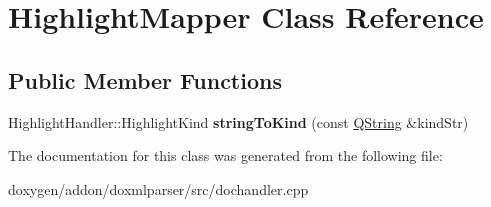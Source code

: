\hypertarget{class_highlight_mapper}{}\section{Highlight\+Mapper Class Reference}
\label{class_highlight_mapper}
\subsection*{Public Member Functions}
\begin{DoxyCompactItemize}
\item 
\mbox{\label{class_highlight_mapper_abdfee00ce4036dd3220e71b0e90ee211}} 
Highlight\+Handler\+::\+Highlight\+Kind {\bfseries string\+To\+Kind} (const \mbox{\hyperlink{class_q_string}{Q\+String}} \&kind\+Str)
\end{DoxyCompactItemize}


The documentation for this class was generated from the following file\+:\begin{DoxyCompactItemize}
\item 
doxygen/addon/doxmlparser/src/dochandler.\+cpp\end{DoxyCompactItemize}
